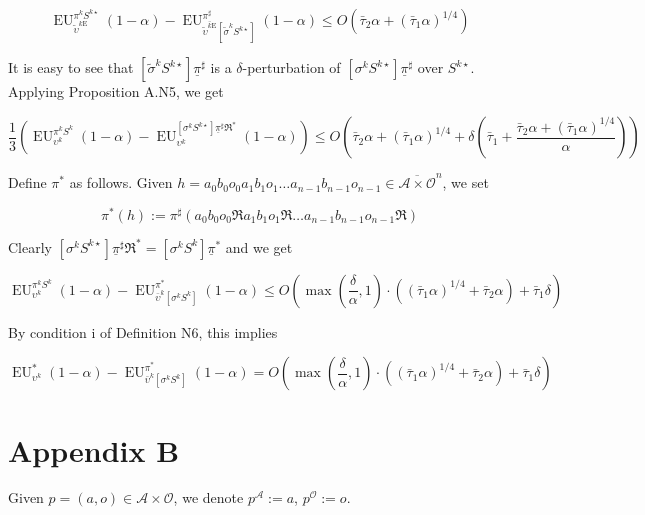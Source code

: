 \documentclass[a4paper]{article}
\newcommand{\Comment}[1]{}
\newcommand{\AP}[1]{\left(#1\right)}
\newcommand{\AB}[1]{\left[#1\right]}
\newcommand{\Ob}{\mathcal{O}}
\newcommand{\A}{\mathcal{A}}
\newcommand{\RME}{\mathrm{E}}
\newcommand{\EU}{\operatorname{EU}}
\begin{document}
$$\EU_{\tilde{\upsilon}^{k\RME}}^{\pi^kS^{k\star}}(1-\alpha) - \EU_{\overline{\tilde{\upsilon}^{k\RME}}\AB{\tilde{\sigma}^k S^{k\star}}}^{\pi^\sharp}(1-\alpha) \leq O\AP{\bar{\tau}_2 \alpha + (\bar{\tau}_1 \alpha)^{1/4}}$$

It is easy to see that $\AB{\tilde{\sigma}^k S^{k\star}}\underline{\pi}^\sharp$ is a $\delta$-perturbation of $\AB{\sigma^k S^{k\star}}\underline{\pi}^\sharp$ over $S^{k\star}$. Applying Proposition A.N5, we get

$$\frac{1}{3}\AP{\EU_{\upsilon^k}^{\pi^k S^{k}}(1-\alpha)-\EU_{\upsilon^k}^{\AB{\sigma^k S^{k\star}}\underline{\pi}^\sharp\Re^*}(1-\alpha)} \leq O\AP{\bar{\tau}_2 \alpha + (\bar{\tau}_1 \alpha)^{1/4} + \delta\AP{\bar{\tau}_1+\frac{\bar{\tau}_2 \alpha + (\bar{\tau}_1 \alpha)^{1/4}}{\alpha}}}$$

\Comment{Given $h = a_0 b_0 o_0 a_1 b_1 o_1 \ldots a_{n-1} b_{n-1} o_{n-1} \in \overline{\A \times \Ob}^n$, we use the notation 

$$\bar{\Re}^*h := a_0 b_0 o_0 \Re a_1 b_1 o_1 \Re \ldots a_{n-1} b_{n-1} o_{n-1} \Re \in \overline{\A \times \Ob'}^n$$

We define $\pi^*$ as by $\pi^*(h) := \pi^\star\AP{\bar{\Re}^*h}$.}

Define $\pi^*$ as follows. Given $h = a_0 b_0 o_0 a_1 b_1 o_1 \ldots a_{n-1} b_{n-1} o_{n-1} \in \overline{\A \times \Ob}^n$, we set

$$\pi^*(h) := \pi^\sharp\AP{a_0 b_0 o_0 \Re a_1 b_1 o_1 \Re \ldots a_{n-1} b_{n-1} o_{n-1} \Re}$$

Clearly $\AB{\sigma^k S^{k\star}}\underline{\pi}^\sharp\Re^* = \AB{\sigma^k S^{k}}\underline{\pi}^*$ and we get

$$\EU_{\upsilon^k}^{\pi^k S^{k}}(1-\alpha)-\EU_{\bar{\upsilon}^k\AB{\sigma^k S^{k}}}^{\pi^*}(1-\alpha) \leq O\AP{\max\AP{\frac{\delta}{\alpha},1}\cdot\AP{(\bar{\tau}_1 \alpha)^{1/4} + \bar{\tau}_2 \alpha}+\bar{\tau}_1\delta}$$

By condition i of Definition N6, this implies

$$\EU_{\upsilon^k}^{*}(1-\alpha)-\EU_{\bar{\upsilon}^k\AB{\sigma^k S^{k}}}^{\pi^*}(1-\alpha) = O\AP{\max\AP{\frac{\delta}{\alpha},1}\cdot\AP{(\bar{\tau}_1 \alpha)^{1/4} + \bar{\tau}_2 \alpha}+\bar{\tau}_1\delta}$$

\section{Appendix B}

Given $p=(a,o)\in\A\times\Ob$, we denote $p^\A:=a$, $p^\Ob:=o$.
\end{document}
